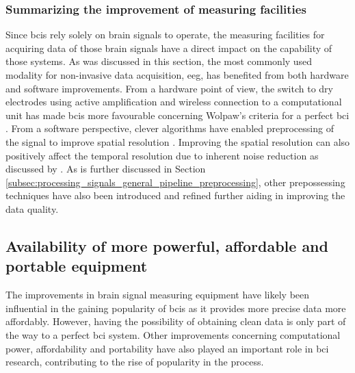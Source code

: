
\subsubsection{Summarizing the improvement of measuring facilities}
\label{subsubsec:bci_gaining_popularity_better_measuring_summary}

Since \glspl{bci} rely solely on brain signals to operate, the measuring facilities for acquiring data of those brain signals have a direct impact on the capability of those systems.
As was discussed in this section, the most commonly used modality for non-invasive data acquisition, \gls{eeg}, has benefited from both hardware and software improvements.
From a hardware point of view, the switch to dry electrodes using active amplification and wireless connection to a computational unit has made \glspl{bci} more favourable concerning Wolpaw's criteria for a perfect \gls{bci} \citep{bluetooth_evaluation, wet_vs_dry, active_electrode_explained}.
From a software perspective, clever algorithms have enabled preprocessing of the signal to improve spatial resolution \citep{improve_eeg_spatial_laplacian1, improve_eeg_spatial_laplacian2, improve_eeg_spatial_laplacian3, improve_eeg_spatial_cnn}.
Improving the spatial resolution can also positively affect the temporal resolution due to inherent noise reduction as discussed by \citet{improve_eeg_spatial_comparison}. 
As is further discussed in Section \ref{subsec:processing_signals_general_pipeline_preprocessing}, other prepossessing techniques have also been introduced and refined further aiding in improving the data quality. 


\subsection{Availability of more powerful, affordable and portable equipment}
\label{subsec:bci_gaining_popularity_better_processing}

The improvements in brain signal measuring equipment have likely been influential in the gaining popularity of \glspl{bci} as it provides more precise data more affordably.
However, having the possibility of obtaining clean data is only part of the way to a perfect \gls{bci} system.
Other improvements concerning computational power, affordability and portability have also played an important role in \gls{bci} research, contributing to the rise of popularity in the process.

